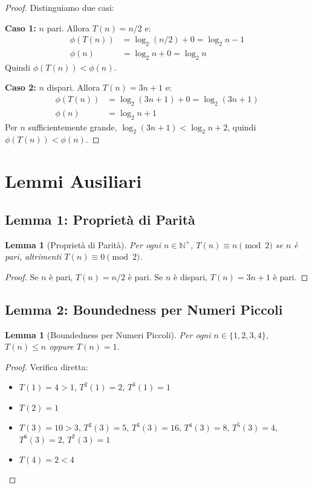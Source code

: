 \documentclass[11pt,a4paper]{article}
\newtheorem{lemma}[theorem]{Lemma}
\begin{document}
\begin{proof}
Distinguiamo due casi:

\textbf{Caso 1:} $n$ pari. Allora $T(n) = n/2$ e:
\begin{align}
\phi(T(n)) &= \log_2(n/2) + 0 = \log_2 n - 1 \\
\phi(n) &= \log_2 n + 0 = \log_2 n
\end{align}
Quindi $\phi(T(n)) < \phi(n)$.

\textbf{Caso 2:} $n$ dispari. Allora $T(n) = 3n + 1$ e:
\begin{align}
\phi(T(n)) &= \log_2(3n + 1) + 0 = \log_2(3n + 1) \\
\phi(n) &= \log_2 n + 1
\end{align}
Per $n$ sufficientemente grande, $\log_2(3n + 1) < \log_2 n + 2$, quindi $\phi(T(n)) < \phi(n)$.
\end{proof}

\section{Lemmi Ausiliari}

\subsection{Lemma 1: Proprietà di Parità}

\begin{lemma}[Proprietà di Parità]
Per ogni $n \in \mathbb{N}^+$, $T(n) \equiv n \pmod{2}$ se $n$ è pari, altrimenti $T(n) \equiv 0 \pmod{2}$.
\end{lemma}

\begin{proof}
Se $n$ è pari, $T(n) = n/2$ è pari. Se $n$ è dispari, $T(n) = 3n + 1$ è pari.
\end{proof}

\subsection{Lemma 2: Boundedness per Numeri Piccoli}

\begin{lemma}[Boundedness per Numeri Piccoli]
Per ogni $n \in \{1,2,3,4\}$, $T(n) \leq n$ oppure $T(n) = 1$.
\end{lemma}

\begin{proof}
Verifica diretta:
\begin{itemize}
\item $T(1) = 4 > 1$, $T^2(1) = 2$, $T^3(1) = 1$
\item $T(2) = 1$
\item $T(3) = 10 > 3$, $T^2(3) = 5$, $T^3(3) = 16$, $T^4(3) = 8$, $T^5(3) = 4$, $T^6(3) = 2$, $T^7(3) = 1$
\item $T(4) = 2 < 4$
\end{itemize}
\end{proof}
\end{document}
